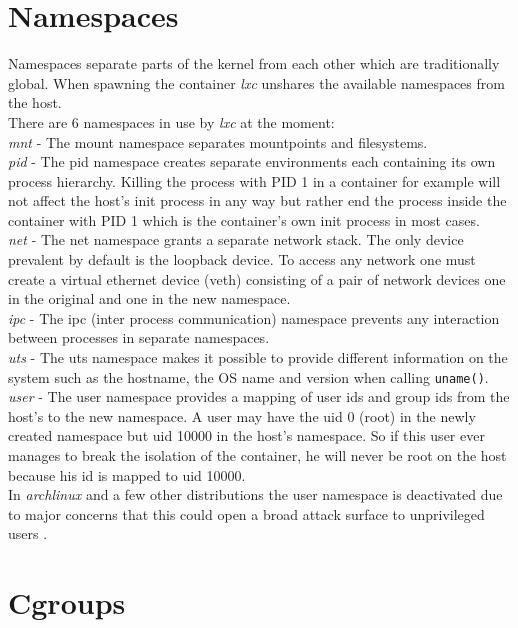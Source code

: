 \section{Namespaces}

Namespaces\cite{namespaces} separate parts of the kernel from each other which are traditionally global. When spawning the container \textit{lxc} unshares
the available namespaces from the host.\\
There are 6 namespaces in use by \textit{lxc} at the moment:\\
\textit{mnt} - The mount namespace separates mountpoints and filesystems.\\
\textit{pid} - The pid namespace creates separate environments each containing its own process hierarchy. Killing the process with PID 1
in a container for example will not affect the host's init process in any way but rather end the process inside the container with PID 1
which is the container's own init process in most cases.\\
\textit{net} - The net namespace grants a separate network stack. The only device prevalent by default is the loopback device. To access any network
one must create a virtual ethernet device (veth) consisting of a pair of network devices one in the original and one in the new namespace.\\
\textit{ipc} - The ipc (inter process communication) namespace prevents any interaction between processes in separate namespaces.\\
\textit{uts} - The uts namespace makes it possible to provide different information on the system such as the hostname, the OS name and version
when calling \texttt{uname()}.\\
\textit{user} - The user namespace provides a mapping of user ids and group ids from the host's to the new namespace. A user may have the uid 0
(root) in the newly created namespace but uid 10000 in the host's namespace. So if this user ever manages to break the isolation of the
container, he will never be root on the host because his id is mapped to uid 10000.\\
In \textit{archlinux} and a few other distributions the user namespace is deactivated due to major concerns that this could open a broad
attack surface to unprivileged users \cite{archuserns}.

\section{Cgroups}

